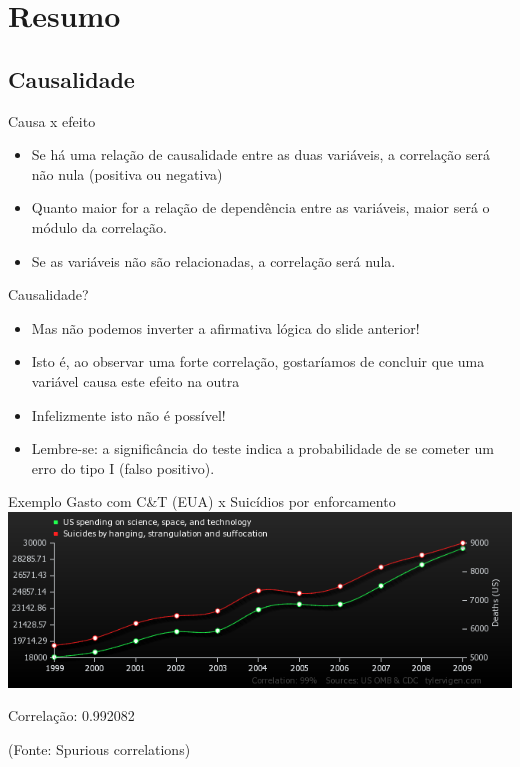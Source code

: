 \documentclass{beamer}
\begin{document}
\section{Resumo}

\subsection{Causalidade}

\begin{frame}{Causa x efeito}
  \begin{itemize}
  \item Se há uma relação de causalidade entre as duas variáveis, a
    correlação será não nula (positiva ou negativa)
  \item Quanto maior for a relação de dependência entre as variáveis,
    maior será o módulo da correlação.
  \item Se as variáveis não são relacionadas, a correlação será nula.
  \end{itemize}
\end{frame}

\begin{frame}{Causalidade?}
  \begin{itemize}
  \item Mas não podemos inverter a afirmativa lógica do slide
    anterior!
  \item Isto é, ao observar uma forte correlação, gostaríamos de
    concluir que uma variável \alert{causa} este efeito na outra
  \item Infelizmente isto não é possível!
  \item Lembre-se: a significância do teste indica a probabilidade de
    se cometer um erro do tipo I (falso positivo).
  \end{itemize}
\end{frame}


\begin{frame}{Exemplo}
  Gasto com C\&T (EUA) x Suicídios por enforcamento
  \includegraphics[width=\textwidth]{Cap17/us-spending-on-science-space-and-technology_suicides-by-hanging-strangulation-and-suffocation}

  Correlação: 0.992082

  (Fonte: Spurious correlations)
\end{frame}
\end{document}

